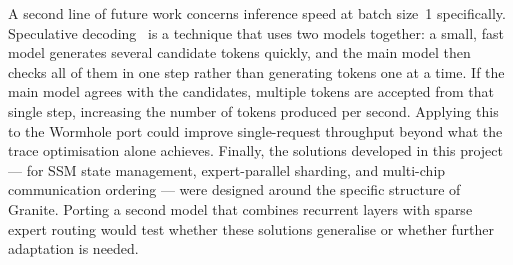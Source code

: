 A second line of future work concerns inference speed at batch size~1 specifically. Speculative decoding~\citep{leviathan2023fast} is a technique that uses two models together: a small, fast model generates several candidate tokens quickly, and the main model then checks all of them in one step rather than generating tokens one at a time. If the main model agrees with the candidates, multiple tokens are accepted from that single step, increasing the number of tokens produced per second. Applying this to the Wormhole port could improve single-request throughput beyond what the trace optimisation alone achieves. Finally, the solutions developed in this project --- for SSM state management, expert-parallel sharding, and multi-chip communication ordering --- were designed around the specific structure of Granite. Porting a second model that combines recurrent layers with sparse expert routing would test whether these solutions generalise or whether further adaptation is needed.
